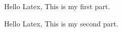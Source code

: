 \documentclass[a4paper]{article}
\begin{document}
Hello Latex, This is my first part.

Hello Latex, This is my second part.


\end{document}
